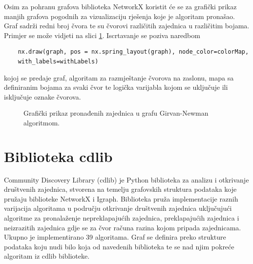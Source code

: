 \documentclass[times, utf8, diplomski]{fer}
\begin{document}
Osim za pohranu grafova biblioteka NetworkX koristit će se za grafički prikaz manjih grafova pogodnih za vizualizaciju rješenja koje je algoritam pronašao. Graf sadrži redni broj čvora te su čvorovi različitih zajednica u različitim bojama. Primjer se može vidjeti na slici \ref{fig:drawing}. Iscrtavanje se poziva naredbom
\begin{verbatim}
	nx.draw(graph, pos = nx.spring_layout(graph), node_color=colorMap,
	with_labels=withLabels)
\end{verbatim}
kojoj se predaje graf, algoritam za razmještanje čvorova na zaslonu, mapa sa definiranim bojama za svaki čvor te logička varijabla kojom se uključuje ili isključuje oznake čvorova. 

\begin{figure}
	\caption{Grafički prikaz pronađenih zajednica u grafu Girvan-Newman algoritmom.}
	\label{fig:drawing}
\end{figure}

\pagebreak

\section{Biblioteka cdlib}
Community Discovery Library (cdlib) \cite{rossetti2019cdlib} je Python biblioteka za analizu i otkrivanje društvenih zajednica, stvorena na temelju grafovskih struktura podataka koje pružaju biblioteke NetworkX i Igraph. Biblioteka pruža implementacije raznih varijacija algoritama u području otkrivanje društvenih zajednica uključujući algoritme za pronalaženje nepreklapajućih zajednica, preklapajućih zajednica i neizrazitih zajednica gdje se za čvor računa razina kojom pripada zajednicama. Ukupno je implementirano 39 algoritama. Graf se definira preko strukture podataka koju nudi bilo koja od navedenih biblioteka te se nad njim pokreće algoritam iz cdlib biblioteke.
\end{document}
